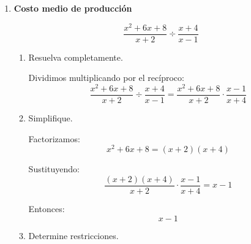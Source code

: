 \documentclass[11pt]{article}
\begin{document}
\begin{enumerate}
\begin{enumerate}[label=\alph*)]
		Sustituimos:
		\[
		\frac{(x-3)(x+3)}{(x-2)^2}\cdot\frac{x-2}{x+3}+\frac{2}{x-2}
		\]
		
		Simplificando:
		\[
		=
		\frac{x-3}{x-2}+\frac{2}{x-2}
		\]
		
		Como tienen el mismo denominador:
		\[
		=
		\frac{x-3+2}{x-2}
		=
		\frac{x-1}{x-2}
		\]
		
		Por lo tanto:
		\[
		\boxed{\frac{x-1}{x-2}}
		\]
		
		\item Determine restricciones.
		
		De los denominadores originales:
		\[
		(x-2)^2\neq 0 \Rightarrow x\neq 2
		\]
		\[
		x+3\neq 0 \Rightarrow x\neq -3
		\]
		Además, en el término adicional:
		\[
		x-2\neq 0 \Rightarrow x\neq 2
		\]
		
		Entonces:
		\[
		\boxed{x\neq 2,\,-3}
		\]
		
		\item Interprete el término adicional.
		
		El término
		\[
		\frac{2}{x-2}
		\]
		actúa como un ajuste adicional del modelo principal. Su efecto es más significativo cuando \(x\) está cercano a \(2\), aunque precisamente ese valor no pertenece al dominio.
		\end{enumerate}
	
\newpage	

\vspace*{0.5em}
	
	\item \textbf{Costo medio de producción}
	
		\[
		\frac{x^2+6x+8}{x+2}\div\frac{x+4}{x-1}
		\]
	
		\begin{enumerate}[label=\alph*)]
		\item Resuelva completamente.
		
		Dividimos multiplicando por el recíproco:
		\[
		\frac{x^2+6x+8}{x+2}\div\frac{x+4}{x-1}
		=
		\frac{x^2+6x+8}{x+2}\cdot\frac{x-1}{x+4}
		\]
		
		\item Simplifique.
		
		Factorizamos:
		\[
		x^2+6x+8=(x+2)(x+4)
		\]
		
		Sustituyendo:
		\[
		\frac{(x+2)(x+4)}{x+2}\cdot\frac{x-1}{x+4}
		=
		x-1
		\]
		
		Entonces:
		\[
		\boxed{x-1}
		\]
		
		\item Determine restricciones.
		

\end{enumerate}
\end{enumerate}
\end{document}
